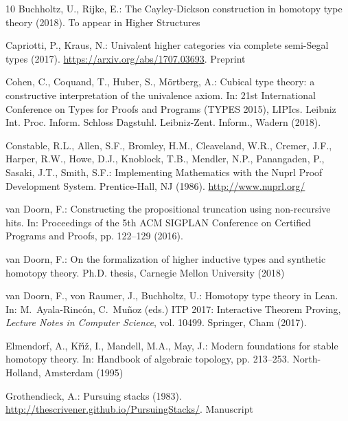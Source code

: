 \documentclass[12pt]{article}
\begin{document}
\begin{thebibliography}{10}
Buchholtz, U., Rijke, E.: The {Cayley-Dickson} construction in homotopy type
  theory (2018).
\newblock To appear in Higher Structures

Capriotti, P., Kraus, N.: Univalent higher categories via complete semi-{Segal}
  types (2017).
\newblock \urlprefix\url{https://arxiv.org/abs/1707.03693}.
\newblock Preprint

Cohen, C., Coquand, T., Huber, S., M{\"o}rtberg, A.: Cubical type theory: a
  constructive interpretation of the univalence axiom.
\newblock In: 21st {I}nternational {C}onference on {T}ypes for {P}roofs and
  {P}rograms (TYPES 2015), LIPIcs. Leibniz Int. Proc. Inform. Schloss Dagstuhl.
  Leibniz-Zent. Inform., Wadern (2018).
\newblock {}

Constable, R.L., Allen, S.F., Bromley, H.M., Cleaveland, W.R., Cremer, J.F.,
  Harper, R.W., Howe, D.J., Knoblock, T.B., Mendler, N.P., Panangaden, P.,
  Sasaki, J.T., Smith, S.F.: Implementing Mathematics with the {Nuprl} Proof
  Development System.
\newblock Prentice-Hall, NJ (1986).
\newblock \urlprefix\url{http://www.nuprl.org/}

van Doorn, F.: Constructing the propositional truncation using non-recursive
  hits.
\newblock In: Proceedings of the 5th ACM SIGPLAN Conference on Certified
  Programs and Proofs, pp. 122--129 (2016).
\newblock {}

van Doorn, F.: On the formalization of higher inductive types and synthetic
  homotopy theory.
\newblock Ph.D. thesis, Carnegie Mellon University (2018)

van Doorn, F., von Raumer, J., Buchholtz, U.: Homotopy type theory in {Lean}.
\newblock In: M.~Ayala-Rinc{\'o}n, C.~Mu{\~n}oz (eds.) ITP 2017: Interactive
  Theorem Proving, \emph{Lecture Notes in Computer Science}, vol. 10499.
  Springer, Cham (2017).
\newblock {}

{Elmendorf}, A., {K\v{r}\'{\i}\v{z}}, I., {Mandell}, M.A., {May}, J.: Modern
  foundations for stable homotopy theory.
\newblock In: Handbook of algebraic topology, pp. 213--253. North-Holland,
  Amsterdam (1995)

Grothendieck, A.: Pursuing stacks (1983).
\newblock \urlprefix\url{http://thescrivener.github.io/PursuingStacks/}.
\newblock Manuscript


\end{thebibliography}
\end{document}
